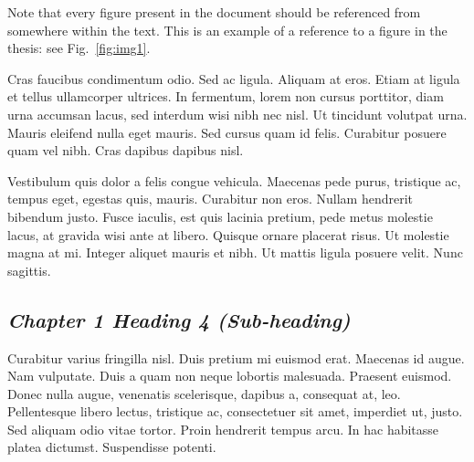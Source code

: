 Note that every figure present in the document should be referenced from somewhere within the text.  This is an example of a reference to a figure in the thesis: see Fig.~\ref{fig:img1}. 


Cras faucibus condimentum odio. Sed ac ligula. Aliquam at eros. Etiam at ligula et tellus ullamcorper ultrices. In fermentum, lorem non cursus porttitor, diam urna accumsan lacus, sed interdum wisi nibh nec nisl. Ut tincidunt volutpat urna. Mauris eleifend nulla eget mauris. Sed cursus quam id felis. Curabitur posuere quam vel nibh. Cras dapibus dapibus nisl.\par

Vestibulum quis dolor a felis congue vehicula. Maecenas pede purus, tristique ac, tempus eget, egestas quis, mauris. Curabitur non eros. Nullam hendrerit bibendum justo. Fusce iaculis, est quis lacinia pretium, pede metus molestie lacus, at gravida wisi ante at libero. Quisque ornare placerat risus. Ut molestie magna at mi. Integer aliquet mauris et nibh. Ut mattis ligula posuere velit. Nunc sagittis.\par

\subsection{\emph{Chapter 1 Heading 4 (Sub-heading)}}

Curabitur varius fringilla nisl. Duis pretium mi euismod erat. Maecenas id augue. Nam vulputate. Duis a quam non neque lobortis malesuada. Praesent euismod. Donec nulla augue, venenatis scelerisque, dapibus a, consequat at, leo. Pellentesque libero lectus, tristique ac, consectetuer sit amet, imperdiet ut, justo. Sed aliquam odio vitae tortor. Proin hendrerit tempus arcu. In hac habitasse platea dictumst. Suspendisse potenti.\par
